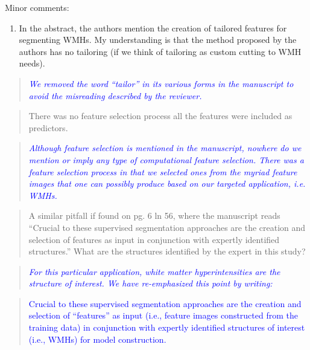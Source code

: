\documentclass[12pt,]{article}
\providecommand{\tightlist}{%
  \setlength{\itemsep}{0pt}\setlength{\parskip}{0pt}}
\begin{document}
Minor comments:

\begin{enumerate}
\def\labelenumi{\arabic{enumi}.}
\setcounter{enumi}{4}
\tightlist
\item
  In the abstract, the authors mention the creation of tailored features
  for segmenting WMHs. My understanding is that the method proposed by
  the authors has no tailoring (if we think of tailoring as custom
  cutting to WMH needs).
\end{enumerate}

\begin{quote}
\emph{\textcolor{blue}{We removed the word ``tailor'' in its various forms in the
manuscript to avoid the misreading described by the reviewer.}}
\end{quote}

\begin{quote}
There was no feature selection process all the features were included as
predictors.
\end{quote}

\begin{quote}
\emph{\textcolor{blue}{Although feature selection is mentioned in the manuscript, nowhere
do we mention or imply any type of computational feature selection.  There was
a feature selection process in that we selected ones from the myriad feature images that
one can possibly produce based on our targeted application, i.e. WMHs.}}
\end{quote}

\begin{quote}
A similar pitfall if found on pg. 6 ln 56, where the manuscript reads
``Crucial to these supervised segmentation approaches are the creation
and selection of features as input in conjunction with expertly
identified structures.'' What are the structures identified by the
expert in this study?
\end{quote}

\begin{quote}
\emph{\textcolor{blue}{For this particular application, white matter hyperintensities
are the structure of interest.  We have re-emphasized this point by writing:
}}
\end{quote}

\begin{quote}
\textcolor{blue}{Crucial to these supervised segmentation approaches are the creation and selection of
``features'' as input (i.e., feature images constructed from the training data)
in conjunction with expertly identified structures of interest
(i.e., WMHs) for model construction.}
\end{quote}
\end{document}
